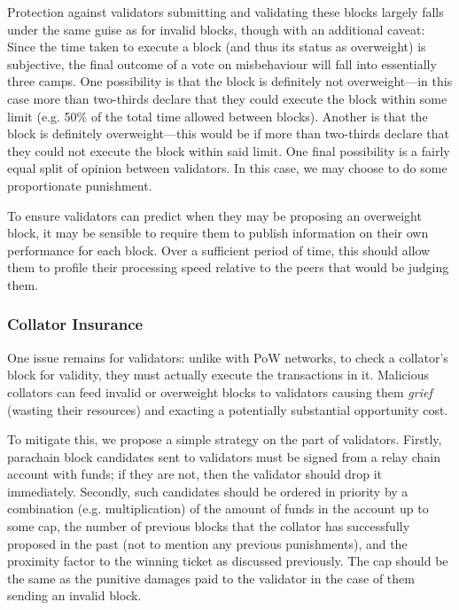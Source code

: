 \documentclass[usepdftitle=false]{beamer}
\makeatletter
\newcommand*\eg{e.g.\@\xspace}
\makeatother
\begin{document}
\begin{frame}
Protection against validators submitting and validating these blocks largely falls under the same guise as for invalid blocks, though with an additional caveat: Since the time taken to execute a block (and thus its status as overweight) is subjective, the final outcome of a vote on misbehaviour will fall into essentially three camps. One possibility is that the block is definitely not overweight---in this case more than two-thirds declare that they could execute the block within some limit (\eg 50\% of the total time allowed between blocks). Another is that the block is definitely overweight---this would be if more than two-thirds declare that they could not execute the block within said limit. One final possibility is a fairly equal split of opinion between validators. In this case, we may choose to do some proportionate punishment.

To ensure validators can predict when they may be proposing an overweight block, it may be sensible to require them to publish information on their own performance for each block. Over a sufficient period of time, this should allow them to profile their processing speed relative to the peers that would be judging them.

\subsubsection{Collator Insurance}

 One issue remains for validators: unlike with PoW networks, to check a collator's block for validity, they must actually execute the transactions in it. Malicious collators
can feed invalid or overweight blocks to validators causing them \textit{grief} (wasting their resources) and exacting a potentially substantial opportunity cost.

 To mitigate this, we propose a simple strategy on the part of validators. Firstly, parachain block candidates sent to validators must be signed from a relay chain account with funds; if they are not, then the validator should drop it immediately. Secondly, such candidates should be ordered in priority by a combination (\eg multiplication) of the amount of funds in the account up to some cap, the number of previous blocks that the collator has successfully proposed in the past (not to mention any previous punishments), and the proximity factor to the winning ticket as discussed previously. The cap should be the same as the punitive damages paid to the validator in the case of them sending an invalid block.


\end{frame}
\end{document}
